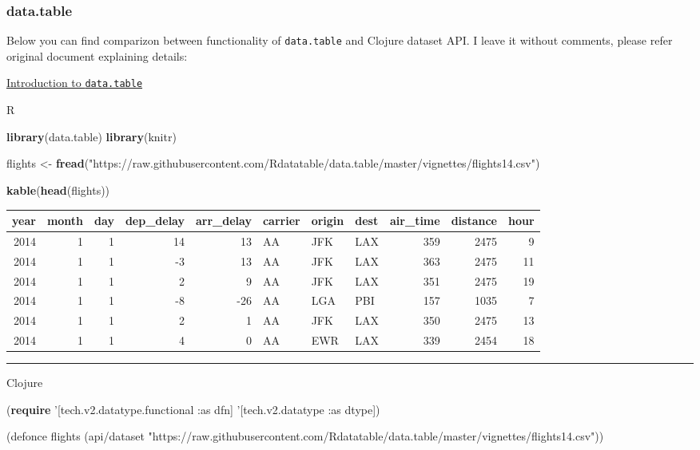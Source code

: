 \documentclass[]{article}
\newenvironment{Shaded}{\begin{snugshade}}{\end{snugshade}}
\newcommand{\KeywordTok}[1]{\textcolor[rgb]{0.13,0.29,0.53}{\textbf{#1}}}
\newcommand{\StringTok}[1]{\textcolor[rgb]{0.31,0.60,0.02}{#1}}
\newcommand{\FunctionTok}[1]{\textcolor[rgb]{0.00,0.00,0.00}{#1}}
\newcommand{\BuiltInTok}[1]{#1}
\newcommand{\AttributeTok}[1]{\textcolor[rgb]{0.77,0.63,0.00}{#1}}
\newcommand{\NormalTok}[1]{#1}
\begin{document}
\subsubsection{data.table}\label{data.table}

Below you can find comparizon between functionality of
\texttt{data.table} and Clojure dataset API. I leave it without
comments, please refer original document explaining details:

\href{https://rdatatable.gitlab.io/data.table/articles/datatable-intro.html}{Introduction
to \texttt{data.table}}

R

\begin{Shaded}
\begin{Highlighting}[]
\KeywordTok{library}\NormalTok{(data.table)}
\KeywordTok{library}\NormalTok{(knitr)}

\NormalTok{flights <-}\StringTok{ }\KeywordTok{fread}\NormalTok{(}\StringTok{"https://raw.githubusercontent.com/Rdatatable/data.table/master/vignettes/flights14.csv"}\NormalTok{)}

\KeywordTok{kable}\NormalTok{(}\KeywordTok{head}\NormalTok{(flights))}
\end{Highlighting}
\end{Shaded}

\begin{longtable}[]{@{}rrrrrlllrrr@{}}
\toprule
year & month & day & dep\_delay & arr\_delay & carrier & origin & dest &
air\_time & distance & hour\tabularnewline
\midrule
\endhead
2014 & 1 & 1 & 14 & 13 & AA & JFK & LAX & 359 & 2475 & 9\tabularnewline
2014 & 1 & 1 & -3 & 13 & AA & JFK & LAX & 363 & 2475 & 11\tabularnewline
2014 & 1 & 1 & 2 & 9 & AA & JFK & LAX & 351 & 2475 & 19\tabularnewline
2014 & 1 & 1 & -8 & -26 & AA & LGA & PBI & 157 & 1035 & 7\tabularnewline
2014 & 1 & 1 & 2 & 1 & AA & JFK & LAX & 350 & 2475 & 13\tabularnewline
2014 & 1 & 1 & 4 & 0 & AA & EWR & LAX & 339 & 2454 & 18\tabularnewline
\bottomrule
\end{longtable}

\begin{center}\rule{0.5\linewidth}{0.5pt}\end{center}

Clojure

\begin{Shaded}
\begin{Highlighting}[]
\NormalTok{(}\KeywordTok{require}\NormalTok{ '[tech.v2.datatype.functional }\AttributeTok{:as}\NormalTok{ dfn]}
\NormalTok{         '[tech.v2.datatype }\AttributeTok{:as}\NormalTok{ dtype])}

\NormalTok{(}\BuiltInTok{defonce}\FunctionTok{ flights }\NormalTok{(api/dataset }\StringTok{"https://raw.githubusercontent.com/Rdatatable/data.table/master/vignettes/flights14.csv"}\NormalTok{))}
\end{Highlighting}
\end{Shaded}
\end{document}
